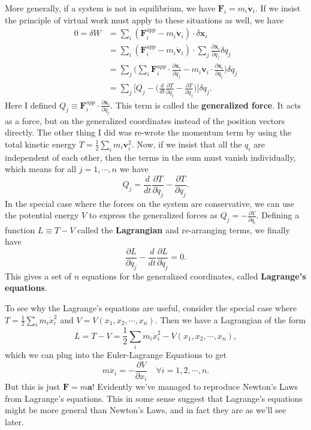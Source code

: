 \documentclass[
  letterpaper,
  DIV=11,
  numbers=noendperiod]{scrreprt}
\begin{document}
More generally, if a system is not in equilibrium, we have
\(\mathbf{F}_i = m_i \mathbf{\dot v}_i\). If we insist the principle of
virtual work must apply to these situations as well, we have \[
\begin{align*}
0 = \delta W &= \sum_i (\mathbf{F}_i^{app} - m_i \mathbf{\dot v}_i) \cdot \delta \mathbf{x}_i \\
&= \sum_i (\mathbf{F}_i^{app} - m_i \mathbf{\dot v}_i) \cdot \sum_j\frac{\partial \mathbf{x}_i}{\partial q_j} \delta q_j \\
&= \sum_j \bigg(\sum_i \mathbf{F}_i^{app} \cdot \frac{\partial \mathbf{x}_i}{\partial q_j}  - m_i \mathbf{\dot v}_i \cdot \frac{\partial \mathbf{x}_i}{\partial q_j} \bigg) \delta q_j \\
&= \sum_j \bigg[ Q_j - \bigg(\frac{d}{dt} \frac{\partial T}{\partial \dot q_j} - \frac{\partial T}{\partial q_j} \bigg) \bigg] \delta q_j.
\end{align*}
\] Here I defined
\(Q_j \equiv \mathbf{F}_i^{app} \cdot \frac{\partial \mathbf{x}_i}{\partial q_j}\).
This term is called the \textbf{generalized force}. It acts as a force,
but on the generalized coordinates instead of the position vectors
directly. The other thing I did was re-wrote the momentum term by using
the total kinetic energy \(T = \frac{1}{2} \sum_i m_i \mathbf{v}_i^2\).
Now, if we insist that all the \(q_i\) are independent of each other,
then the terms in the sum must vanish individually, which means for all
\(j=1,\cdots,n\) we have \[
Q_j = \frac{d}{dt} \frac{\partial T}{\partial \dot q_j} - \frac{\partial T}{\partial q_j}.
\] In the special case where the forces on the system are conservative,
we can use the potential energy \(V\) to express the generalized forces
as \(Q_j = -\frac{\partial V}{\partial q_i}\). Defining a function
\(L \equiv T - V\) called the \textbf{Lagrangian} and re-arranging
terms, we finally have \[
\frac{\partial L}{\partial q_j} - \frac{d}{dt} \frac{\partial L}{\partial \dot q_j} = 0.
\] This gives a set of \(n\) equations for the generalized coordinates,
called \textbf{Lagrange's equations}.

To see why the Lagrange's equations are useful, consider the special
case where \(T=\frac{1}{2} \sum_i m_i \dot x_i^2\) and
\(V = V(x_1, x_2, \cdots, x_n)\). Then we have a Lagrangian of the form
\[
L = T - V = \frac{1}{2} \sum_i m_i \dot x_i^2 - V(x_1, x_2, \cdots, x_n),
\] which we can plug into the Euler-Lagrange Equations to get \[
m \ddot x_i = - \frac{\partial V}{\partial x_i} \quad \forall i=1,2,\cdots,n.
\] But this is just \(\mathbf{F} = m \mathbf{a}\)! Evidently we've
managed to reproduce Newton's Laws from Lagrange's equations. This in
some sense suggest that Lagrange's equations might be more general than
Newton's Laws, and in fact they are as we'll see later.
\end{document}
